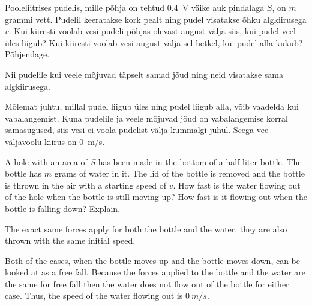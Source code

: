 
Pooleliitrises pudelis, mille põhja on tehtud \SI{0.4}{V} väike auk pindalaga $S$, on $m$ grammi vett. Pudelil keeratakse kork pealt ning pudel visatakse õhku algkiirusega $v$. Kui kiiresti voolab vesi pudeli põhjas olevast august välja siis, kui pudel veel üles liigub? Kui kiiresti voolab vesi august välja sel hetkel, kui pudel alla kukub? Põhjendage.

\hint
Nii pudelile kui veele mõjuvad täpselt samad jõud ning neid visatakse sama algkiirusega.

\solu
Mõlemat juhtu, millal pudel liigub üles ning pudel liigub alla, võib vaadelda kui vabalangemist. Kuna pudelile ja veele mõjuvad jõud on vabalangemise korral samasugused, siis vesi ei voola pudelist välja kummalgi juhul. Seega vee väljavoolu kiirus on \SI{0}{m/s}.

A hole with an area of $S$ has been made in the bottom of a half-liter bottle. The bottle has $m$ grams of water in it. The lid of the bottle is removed and the bottle is thrown in the air with a starting speed of $v$. How fast is the water flowing out of the hole when the bottle is still moving up? How fast is it flowing out when the bottle is falling down? Explain.

\hinteng
The exact same forces apply for both the bottle and the water, they are also thrown with the same initial speed.

\solueng
Both of the cases, when the bottle moves up and the bottle moves down, can be looked at as a free fall. Because the forces applied to the bottle and the water are the same for free fall then the water does not flow out of the bottle for either case. Thus, the speed of the water flowing out is $\SI{0}{m/s}$.
\probend